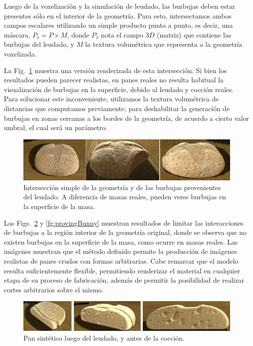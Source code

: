 Luego de la voxelización y la simulación de leudado, las burbujas deben estar presentes sólo en el interior de la geometría.
Para esto, intersectamos ambos campos escalares utilizando un simple producto punto a punto, es decir, una máscara, $P_{1} = P \times M$, donde $P_{1}$ nota el campo $3D$ (matriz) que contiene las burbujas del leudado, y $M$ la textura volumétrica que representa a la geometría voxelizada.

La Fig.~\ref{fg:intersectProblem} muestra una versión renderizada de esta intersección.
Si bien los resultados pueden parecer realistas, en panes reales no resulta habitual la visualización de burbujas en la superficie, debido al leudado y cocción reales.
Para solucionar este inconveniente, utilizamos la textura volumétrica de distancias que computamos previamente, para deshabilitar la generación de burbujas en zonas cercanas a los bordes de la geometría, de acuerdo a cierto valor umbral, el cual será un parámetro.


\begin{figure}
\includegraphics[width=12cm]{figures/intersectProblem}
\caption[Intersección simple de la geometría y de las burbujas provenientes del leudado]{Intersección simple de la geometría y de las burbujas provenientes del leudado. A diferencia de masas reales, pueden verse burbujas en la superficie de la masa.}
\label{fg:intersectProblem}
\end{figure}


Las Figs.~\ref{fg:proving} y \ref{fg:provingBunny} muestran resultados de limitar las interacciones de burbujas a la región interior de la geometría original, donde se observa que no existen burbujas en la superficie de la masa, como ocurre en masas reales.
Las imágenes muestran que el método definido permite la producción de imágenes realistas de panes crudos con formas arbitrarias.
Cabe remarcar que el modelo resulta suficientemente flexible, permitiendo renderizar el material en cualquier etapa de su proceso de fabricación, además de permitir la posibilidad de realizar cortes arbitrarios sobre el mismo.

\begin{figure}
\includegraphics[width=12cm]{figures/prebakebread}
\caption{Pan sintético luego del leudado, y antes de la cocción.}
\label{fg:proving}
\end{figure}

